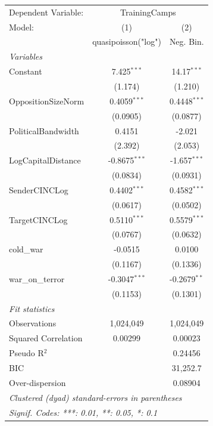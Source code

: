 
\begingroup
\centering
\begin{tabular}{lcc}
   \tabularnewline \midrule \midrule
   Dependent Variable: & \multicolumn{2}{c}{TrainingCamps}\\
   Model:              & (1)                  & (2)\\  
                       &  quasipoisson("log") & Neg. Bin.\\  
   \midrule
   \emph{Variables}\\
   Constant            & 7.425$^{***}$        & 14.17$^{***}$\\   
                       & (1.174)              & (1.210)\\   
   OppositionSizeNorm  & 0.4059$^{***}$       & 0.4448$^{***}$\\   
                       & (0.0905)             & (0.0877)\\   
   PoliticalBandwidth  & 0.4151               & -2.021\\   
                       & (2.392)              & (2.053)\\   
   LogCapitalDistance  & -0.8675$^{***}$      & -1.657$^{***}$\\   
                       & (0.0834)             & (0.0931)\\   
   SenderCINCLog       & 0.4402$^{***}$       & 0.4582$^{***}$\\   
                       & (0.0617)             & (0.0502)\\   
   TargetCINCLog       & 0.5110$^{***}$       & 0.5579$^{***}$\\   
                       & (0.0767)             & (0.0632)\\   
   cold\_war           & -0.0515              & 0.0100\\   
                       & (0.1167)             & (0.1336)\\   
   war\_on\_terror     & -0.3047$^{***}$      & -0.2679$^{**}$\\   
                       & (0.1153)             & (0.1301)\\   
   \midrule
   \emph{Fit statistics}\\
   Observations        & 1,024,049            & 1,024,049\\  
   Squared Correlation & 0.00299              & 0.00023\\  
   Pseudo R$^2$        &                      & 0.24456\\  
   BIC                 &                      & 31,252.7\\  
   Over-dispersion     &                      & 0.08904\\  
   \midrule \midrule
   \multicolumn{3}{l}{\emph{Clustered (dyad) standard-errors in parentheses}}\\
   \multicolumn{3}{l}{\emph{Signif. Codes: ***: 0.01, **: 0.05, *: 0.1}}\\
\end{tabular}
\par\endgroup


